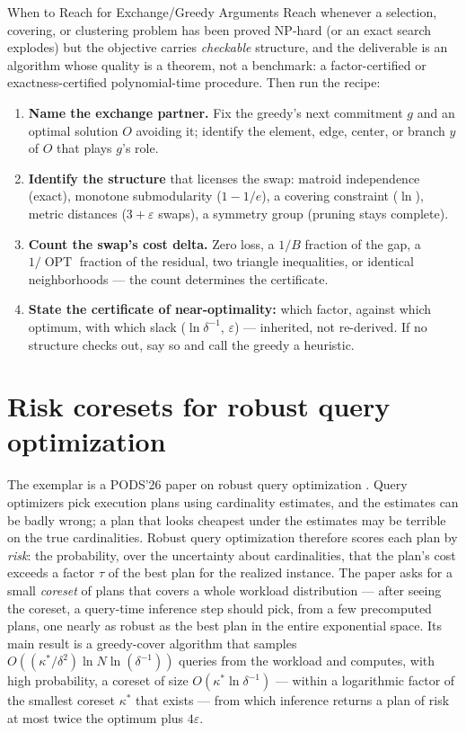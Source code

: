 \begin{reachbox}{When to Reach for Exchange/Greedy Arguments}
Reach whenever a selection, covering, or clustering problem has been proved NP-hard
(or an exact search explodes) but the objective carries \emph{checkable} structure,
and the deliverable is an algorithm whose quality is a theorem, not a benchmark: a
factor-certified or exactness-certified polynomial-time procedure. Then run the
recipe:
\begin{enumerate}
\item \textbf{Name the exchange partner.} Fix the greedy's next commitment $g$ and an
  optimal solution $O$ avoiding it; identify the element, edge, center, or branch $y$
  of $O$ that plays $g$'s role.
\item \textbf{Identify the structure} that licenses the swap: matroid independence
  (exact), monotone submodularity ($1-1/e$), a covering constraint ($\ln$), metric
  distances ($3+\varepsilon$ swaps), a symmetry group (pruning stays complete).
\item \textbf{Count the swap's cost delta.} Zero loss, a $1/B$ fraction of the gap, a
  $1/\operatorname{OPT}$ fraction of the residual, two triangle inequalities, or
  identical neighborhoods --- the count determines the certificate.
\item \textbf{State the certificate of near-optimality:} which factor, against which
  optimum, with which slack ($\ln\delta^{-1}$, $\varepsilon$) --- inherited, not
  re-derived. If no structure checks out, say so and call the greedy a heuristic.
\end{enumerate}
\end{reachbox}

\section{Risk coresets for robust query optimization}
\label{sec:exc-053}

The exemplar is a PODS'26 paper on robust query optimization \citep{sigmod26-053}\pods.
Query optimizers pick execution plans using cardinality estimates, and the estimates
can be badly wrong; a plan that looks cheapest under the estimates may be terrible on
the true cardinalities. Robust query optimization therefore scores each plan by
\emph{risk}: the probability, over the uncertainty about cardinalities, that the
plan's cost exceeds a factor $\tau$ of the best plan for the realized instance. The
paper asks for a small \emph{coreset} of plans that covers a whole workload
distribution --- after seeing the coreset, a query-time inference step should pick,
from a few precomputed plans, one nearly as robust as the best plan in the entire
exponential space. Its main result is a greedy-cover algorithm that samples
$O((\kappa^{*}/\delta^{2})\ln N\ln(\delta^{-1}))$ queries from the workload and
computes, with high probability, a coreset of size $O(\kappa^{*}\ln\delta^{-1})$ ---
within a logarithmic factor of the smallest coreset $\kappa^{*}$ that exists --- from
which inference returns a plan of risk at most twice the optimum plus $4\varepsilon$.

